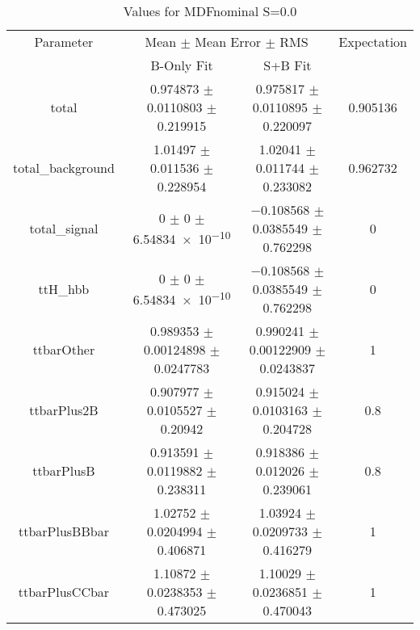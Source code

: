 \begin{table}
\centering
\caption{Values for MDFnominal S=0.0}
\begin{tabular}{cccc}
\toprule
Parameter & \multicolumn{2}{c}{Mean $\pm$ Mean Error $\pm$ RMS} & Expectation\\
 & B-Only Fit & S+B Fit & \\
\midrule
total & \num{0.974873} $\pm$ \num{0.0110803} $\pm$ \num{0.219915} & \num{0.975817} $\pm$ \num{0.0110895} $\pm$ \num{0.220097} & \num{0.905136}\\
total\_background & \num{1.01497} $\pm$ \num{0.011536} $\pm$ \num{0.228954} & \num{1.02041} $\pm$ \num{0.011744} $\pm$ \num{0.233082} & \num{0.962732}\\
total\_signal & \num{0} $\pm$ \num{0} $\pm$ \num{6.54834e-10} & \num{-0.108568} $\pm$ \num{0.0385549} $\pm$ \num{0.762298} & \num{0}\\
ttH\_hbb & \num{0} $\pm$ \num{0} $\pm$ \num{6.54834e-10} & \num{-0.108568} $\pm$ \num{0.0385549} $\pm$ \num{0.762298} & \num{0}\\
ttbarOther & \num{0.989353} $\pm$ \num{0.00124898} $\pm$ \num{0.0247783} & \num{0.990241} $\pm$ \num{0.00122909} $\pm$ \num{0.0243837} & \num{1}\\
ttbarPlus2B & \num{0.907977} $\pm$ \num{0.0105527} $\pm$ \num{0.20942} & \num{0.915024} $\pm$ \num{0.0103163} $\pm$ \num{0.204728} & \num{0.8}\\
ttbarPlusB & \num{0.913591} $\pm$ \num{0.0119882} $\pm$ \num{0.238311} & \num{0.918386} $\pm$ \num{0.012026} $\pm$ \num{0.239061} & \num{0.8}\\
ttbarPlusBBbar & \num{1.02752} $\pm$ \num{0.0204994} $\pm$ \num{0.406871} & \num{1.03924} $\pm$ \num{0.0209733} $\pm$ \num{0.416279} & \num{1}\\
ttbarPlusCCbar & \num{1.10872} $\pm$ \num{0.0238353} $\pm$ \num{0.473025} & \num{1.10029} $\pm$ \num{0.0236851} $\pm$ \num{0.470043} & \num{1}\\
\bottomrule
\end{tabular}
\end{table}